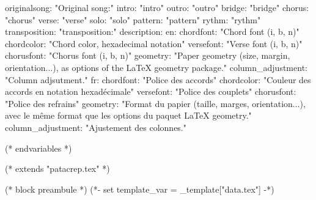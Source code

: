       originalsong: "Original song:"
      intro: "intro"
      outro: "outro"
      bridge: "bridge"
      chorus: "chorus"
      verse: "verse"
      solo: "solo"
      pattern: "pattern"
      rythm: "rythm"
      transposition: "transposition:"
description:
  en:
    chordfont: "Chord font (i, b, n)"
    chordcolor: "Chord color, hexadecimal notation"
    versefont: "Verse font (i, b, n)"
    chorusfont: "Chorus font (i, b, n)"
    geometry: "Paper geometry (size, margin, orientation...), as options of the LaTeX geometry package."
    column_adjustment: "Column adjsutment."
  fr:
    chordfont: "Police des accords"
    chordcolor: "Couleur des accords en notation hexadécimale"
    versefont: "Police des couplets"
    chorusfont: "Police des refrains"
    geometry: "Format du papier (taille, marges, orientation...), avec le même format que les options du paquet LaTeX geometry."
    column_adjustment: "Ajustement des colonnes."


(* endvariables *)

(* extends "patacrep.tex" *)

(* block preambule *)
(*- set template_var = _template["data.tex"] -*)
\usepackage{licence}

\makeatletter
\renewcommand{\chorusfont}{%
   (* for letter in template_var.chorusfont *)
   (* if letter=="i" *)   \it %
   (* elif letter=='b' *)   \bf %
   (* elif letter=='n' *)   \normalfont %
   (* endif *)
   (* endfor *)
}

\def\@chordfont{%
   (* for letter in template_var.chordfont *)
   (* if letter=="i" *)   \it %
   (* elif letter=='b' *)   \bf %
   (* elif letter=='n' *)   \normalfont %
   (* endif *)
   (* endfor *)
}
\renewcommand{\printchord}[1]{\@chordfont\textcolor{ChordColor}{#1}}

\renewcommand{\lyricfont}{%
   (* for letter in template_var.versefont *)
   (* if letter=="i" *)   \it %
   (* elif letter=='b' *)   \bf %
   (* elif letter=='n' *)   \normalfont %
   (* endif *)
   (* endfor *)
}
\makeatother

\geometry{
 ((template_var.geometry))
}

\let\OldSongColumns=\songcolumns
\def\songcolumns#1{%
(* if template_var.column_adjustment=="only_one" *)
    \OldSongColumns{1}
(* elif template_var.column_adjustment=="one_more" *)
    \count0=#1\relax\advance\count0 by 1\relax%
    \OldSongColumns{\count0}
(* else *)
    \OldSongColumns{#1}
(* endif *)
}

